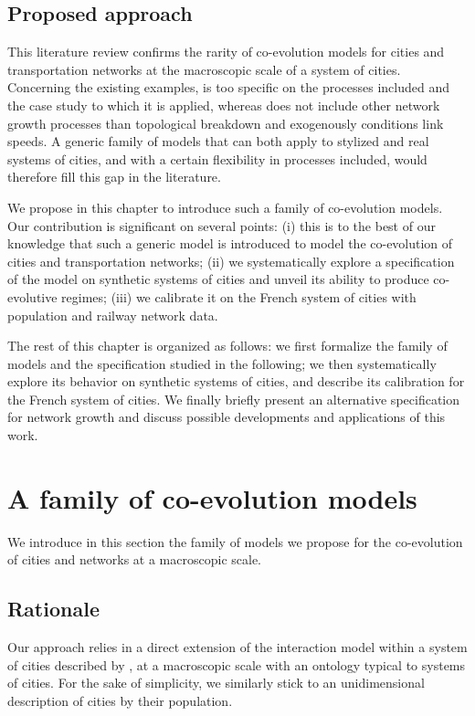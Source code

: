 \documentclass[11pt]{article}
\begin{document}
\subsection{Proposed approach}

This literature review confirms the rarity of co-evolution models for cities and transportation networks at the macroscopic scale of a system of cities. Concerning the existing examples, \cite{baptistemodeling} is too specific on the processes included and the case study to which it is applied, whereas \cite{schmitt2014modelisation} does not include other network growth processes than topological breakdown and exogenously conditions link speeds. A generic family of models that can both apply to stylized and real systems of cities, and with a certain flexibility in processes included, would therefore fill this gap in the literature.

We propose in this chapter to introduce such a family of co-evolution models. Our contribution is significant on several points: (i) this is to the best of our knowledge that such a generic model is introduced to model the co-evolution of cities and transportation networks; (ii) we systematically explore a specification of the model on synthetic systems of cities and unveil its ability to produce co-evolutive regimes; (iii) we calibrate it on the French system of cities with population and railway network data.

The rest of this chapter is organized as follows: we first formalize the family of models and the specification studied in the following; we then systematically explore its behavior on synthetic systems of cities, and describe its calibration for the French system of cities. We finally briefly present an alternative specification for network growth and discuss possible developments and applications of this work.


\section{A family of co-evolution models}

We introduce in this section the family of models we propose for the co-evolution of cities and networks at a macroscopic scale.


\subsection{Rationale}

Our approach relies in a direct extension of the interaction model within a system of cities described by \cite{raimbault2018indirect}, at a macroscopic scale with an ontology typical to systems of cities. For the sake of simplicity, we similarly stick to an unidimensional description of cities by their population.
\end{document}
